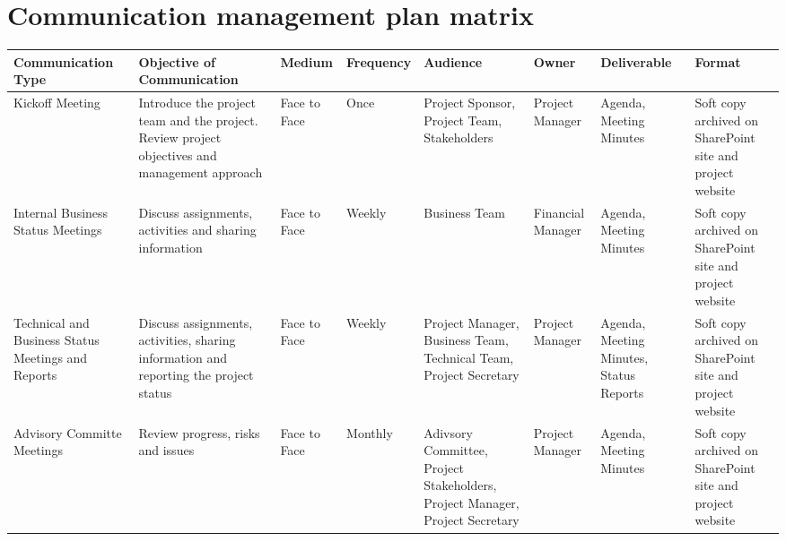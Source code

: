\section{Communication management plan matrix}
\begin{landscape}

\begin{table}[H]
	\centering
	\begin{tabular}{| >{\raggedright\arraybackslash}p{2.8cm}  | >{\raggedright\arraybackslash}p{3.2cm} | >{\raggedright\arraybackslash}p{2.4cm} | >{\raggedright\arraybackslash}p{1.8cm} | >{\raggedright\arraybackslash}p{2.4cm} | >{\raggedright\arraybackslash}p{1.8cm} | >{\raggedright\arraybackslash}p{2cm} | >{\raggedright\arraybackslash}p{2.8cm} |  }
		

\toprule [2pt]
		\textbf{Communication Type} & \textbf{Objective of Communication} & \textbf{Medium}  &\textbf{Frequency} &\textbf{Audience}& \textbf{Owner}& \textbf{Deliverable} &\textbf{Format} \\  
\midrule [1.5pt]
	
		Kickoff Meeting & Introduce the project team and the project. Review project objectives and management approach &  Face to Face  & Once  &  Project Sponsor, Project Team, Stakeholders   & Project Manager  & Agenda, Meeting Minutes & Soft copy archived on SharePoint site and project website\\  
		
		\hline
		
		Internal Business Status Meetings& Discuss assignments, activities and sharing information  & Face to Face   &  Weekly &Business Team     & Financial Manager  & Agenda, Meeting Minutes  &Soft copy archived on SharePoint site and project website\\  
		
		\hline
		
		Technical and Business Status Meetings and Reports&Discuss assignments, activities, sharing information and reporting the project status   &Face to Face    & Weekly  & Project Manager, Business Team, Technical Team, Project Secretary    &Project Manager   & Agenda, Meeting Minutes, Status Reports  &Soft copy archived on SharePoint site and project website\\  
		
		\hline
		
		Advisory Committe Meetings& Review progress, risks and issues  & Face to Face   &Monthly   &  Adivsory Committee, Project Stakeholders, Project Manager, Project Secretary   &Project Manager   & Agenda, Meeting Minutes  &Soft copy archived on SharePoint site and project website\\  
		

\end{tabular}
\end{table}
\end{landscape}
